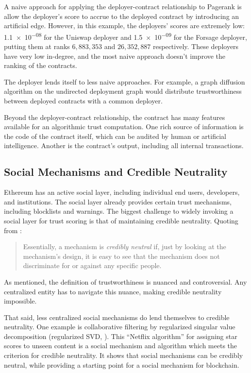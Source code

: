 \documentclass[a4paper]{article}
\begin{document}
A naive approach for applying the deployer-contract relationship to Pagerank is allow the deployer's score to accrue to the deployed contract by introducing an artificial edge.  However, in this example, the deployers' scores are extremely low:  \num{1.1e-08} for the Uniswap deployer and \num{1.5e-09} for the Forsage deployer, putting them at ranks $6,883,353$ and $26,352,887$ respectively.  These deployers have very low in-degree, and the most naive approach doesn't improve the ranking of the contracts.
	
The deployer lends itself to less naive approaches.  For example, a graph diffusion algorithm on the undirected deployment graph would distribute trustworthiness between deployed contracts with a common deployer.

Beyond the deployer-contract relationship, the contract has many features available for an algorithmic trust computation.  One rich source of information is the code of the contract itself, which can be audited by human or artificial intelligence.  Another is the contract's output, including all internal transactions.

\subsection{Social Mechanisms and Credible Neutrality}

Ethereum has an active social layer, including individual end users, developers, and institutions.  The social layer already provides certain trust mechanisms, including blocklists and warnings. The biggest challenge to widely invoking a social layer for trust scoring is that of maintaining credible neutrality.  Quoting from \cite{Vitalik}:
\begin{quote}
Essentially, a mechanism is {\it credibly neutral} if, just by looking at the mechanism’s design, it is easy to see that the mechanism does not discriminate for or against any specific people.
\end{quote}
As mentioned, the definition of trustworthiness is nuanced and controversial. Any centralized entity has to navigate this nuance, making credible neutrality impossible.

That said, less centralized social mechanisms do lend themselves to credible neutrality.  One example is collaborative filtering by regularized singular value decomposition (regularized SVD, \cite{Netflix1, Netflix2}).  This ``Netflix algorithm'' for assigning star scores to unseen content is a social mechanism and algorithm which meets the criterion for credible neutrality.  It shows that social mechanisms can be credibly neutral, while providing a starting point for a social mechanism for blockchain.
\end{document}
